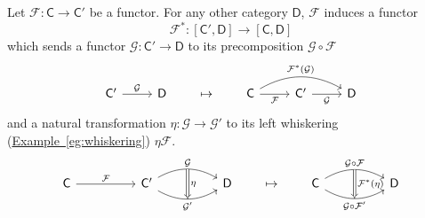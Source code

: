 \documentclass[notes.tex]{subfiles}
\begin{document}
Let $\mathcal{F}\colon \mathsf{C} \to \mathsf{C}'$ be a functor. For any other category $\mathsf{D}$, $\mathcal{F}$ induces a functor
\begin{equation*}
  \mathcal{F}^{*}\colon [\mathsf{C}', \mathsf{D}] \to [\mathsf{C}, \mathsf{D}]
\end{equation*}
which sends a functor $\mathcal{G}\colon \mathsf{C}' \to \mathsf{D}$ to its precomposition $\mathcal{G} \circ \mathcal{F}$
\begin{equation*}
  \begin{tikzcd}
    \mathsf{C}'
    \arrow[r, "\mathcal{G}"]
    & \mathsf{D}
  \end{tikzcd}
  \qquad
  \mapsto
  \qquad
  \begin{tikzcd}
    \mathsf{C}
    \arrow[r, swap, "\mathcal{F}"]
    \arrow[rr, bend left, "\mathcal{F}^{*}(\mathcal{G})"]
    & \mathsf{C'}
    \arrow[r, swap, "\mathcal{G}"]
    & \mathsf{D}
  \end{tikzcd}
\end{equation*}
and a natural transformation $\eta\colon \mathcal{G} \to \mathcal{G}'$ to its left whiskering (\hyperref[eg:whiskering]{Example~\ref*{eg:whiskering}}) $\eta\mathcal{F}$.
\begin{equation*}
  \begin{tikzcd}[column sep=huge]
    \mathsf{C}
    \arrow[r, "\mathcal{F}"]
    &\mathsf{C}'
    \arrow[r, bend left, "\mathcal{G}"{name=U}]
    \arrow[r, bend right, swap, "\mathcal{G}'"{name=D}]
    & \mathsf{D}
    \arrow[from=U, to=D, Rightarrow, "\eta"]
  \end{tikzcd} 
  \qquad
  \mapsto
  \qquad
  \begin{tikzcd}[column sep=huge]
    \mathsf{C}
    \arrow[r, bend left, "\mathcal{G} \circ \mathcal{F}"{name=U}]
    \arrow[r, bend right, swap, "\mathcal{G} \circ \mathcal{F}'"{name=D}]
    & \mathsf{D}
    \arrow[from=U, to=D, Rightarrow, "\mathcal{F}^{*}(\eta)"]
  \end{tikzcd}
\end{equation*}
\end{document}
